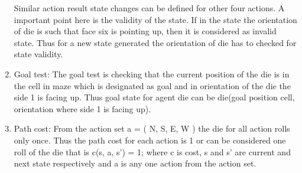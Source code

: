 \documentclass[12pt]{article}
\begin{document}
\begin{enumerate}
	Similar action result state changes can be defined for other four actions. A important point here is the validity of the state. If in the state the orientation of die is such that face six is pointing up, then it is considered as invalid state. Thus for a new state generated the orientation of die has to checked for state validity. 
	\item Goal test: The goal test is checking that the current position of the die is in the cell in maze which is designated as goal and in orientation of the die the side 1 is facing up. Thus goal state for agent die can be die(goal position cell, orientation where side 1 is facing up).
	\item Path cost: From the action set a = ( N, S, E, W ) the die for all action rolls only once. Thus the path cost for each action is 1 or can be considered one roll of the die that is c(s, a, s') = 1; where c is cost, s and s' are current and next state respectively and a is any one action from the action set.
\end{enumerate}
\end{document}
